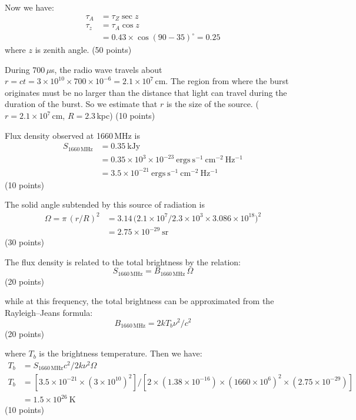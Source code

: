 Now we have:
\begin{align*}
\tau_A &= \tau_Z \sec z\\
\tau_z &= \tau_A \cos z\\
       &= 0.43 \times \cos(90 - 35)^\circ = 0.25
\end{align*}
where $z$ is zenith angle. \hfill(50 points)

During 700\,$\mu$s, the radio wave travels about
$r = ct = 3\times10^{10}\times700\times10^{-6} = 2.1\times10^{7}$\,cm. The
region from where the burst originates must be no larger than the distance
that light can travel during the duration of the burst. So we estimate that
$r$ is the size of the source. ($r = 2.1\times10^{7}$\,cm,
$R = 2.3$\,kpc) \hfill(10 points)

Flux density observed at 1660\,MHz is
\begin{align*}
S_{\mathrm{1660\,MHz}} &= 0.35\ \mathrm{kJy}\\
  &= 0.35\times10^{3}\times10^{-23}\
     \mathrm{ergs\ s^{-1}\ cm^{-2}\ Hz^{-1}}\\
  &= 3.5\times10^{-21}\ \mathrm{ergs\ s^{-1}\ cm^{-2}\ Hz^{-1}}
\end{align*}
\hfill(10 points)

The solid angle subtended by this source of radiation is
\begin{align*}
\Omega = \pi\,(r/R)^2
  &= 3.14\,\bigl(2.1\times10^{7}/2.3\times10^{3}\times
     3.086\times10^{18}\bigr)^2\\
  &= 2.75\times10^{-29}\ \mathrm{sr}
\end{align*}
\hfill(30 points)

The flux density is related to the total brightness by the relation:
\[ S_{\mathrm{1660\,MHz}} = B_{\mathrm{1660\,MHz}}\,\Omega \]
\hfill(20 points)

while at this frequency, the total brightness can be approximated from the
Rayleigh--Jeans formula:
\[ B_{\mathrm{1660\,MHz}} = 2kT_b\nu^2/c^2 \]
\hfill(20 points)

where $T_b$ is the brightness temperature. Then we have:
\begin{align*}
T_b &= S_{\mathrm{1660\,MHz}}c^2/2k\nu^2\Omega\\
T_b &= [3.5\times10^{-21}\times(3\times10^{10})^2]/
       [2\times(1.38\times10^{-16})\times(1660\times10^{6})^2
        \times(2.75\times10^{-29})]\\
    &= 1.5\times10^{26}\ \mathrm{K}
\end{align*}
\hfill(10 points)

